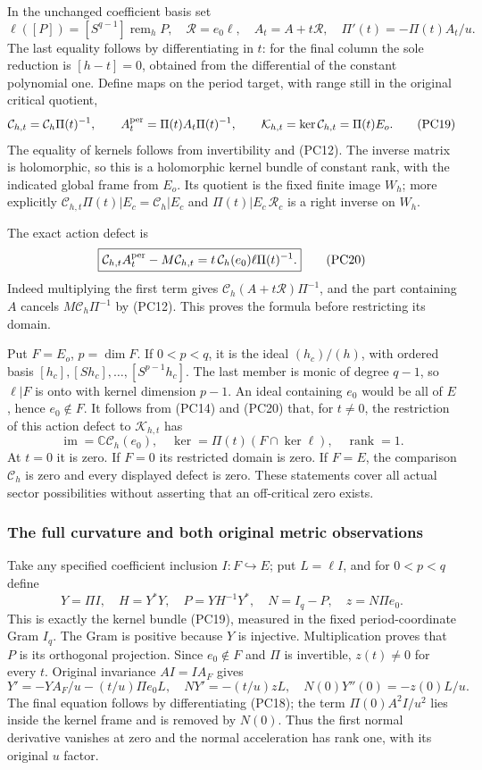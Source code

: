 In the unchanged coefficient basis set
\[
 \ell([P])=[S^{q-1}]\operatorname{rem}_hP,\quad
 \mathcal R=e_0\ell,\quad A_t=A+t\mathcal R,\quad
 \Pi'(t)=-\Pi(t)A_t/u.
 \tag{PC18}
\]
The last equality follows by differentiating in $t$: for the final
column the sole reduction is $[h-t]=0$, obtained from the
differential of the constant polynomial one.
Define maps on the period target, with range still in the original
critical quotient,
\[
 \mathcal C_{h,t}=\mathcal C_h\Pi(t)^{-1},\qquad
 A_t^{\rm per}=\Pi(t)A_t\Pi(t)^{-1},\qquad
 \mathcal K_{h,t}=\ker\mathcal C_{h,t}=\Pi(t)E_o.
 \tag{PC19}
\]
The equality of kernels follows from invertibility and (PC12).
The inverse matrix is holomorphic, so this is a holomorphic kernel
bundle of constant rank, with the indicated global frame from $E_o$.
Its quotient is the fixed finite image $W_h$; more explicitly
$\mathcal C_{h,t}\Pi(t)|E_c=\mathcal C_h|E_c$ and
$\Pi(t)|E_c\,\mathcal R_c$ is a right inverse on $W_h$.

The exact action defect is
\[
 \boxed{\mathcal C_{h,t}A_t^{\rm per}-M\mathcal C_{h,t}
       =t\,\mathcal C_h(e_0)\ell\Pi(t)^{-1}.}
 \tag{PC20}
\]
Indeed multiplying the first term gives
$\mathcal C_h(A+t\mathcal R)\Pi^{-1}$, and the part containing
$A$ cancels $M\mathcal C_h\Pi^{-1}$ by (PC12).  This proves
the formula before restricting its domain.

Put $F=E_o$, $p=\dim F$.  If $0<p<q$, it is the ideal
$(h_c)/(h)$, with ordered basis
$[h_c],[Sh_c],\ldots,[S^{p-1}h_c]$.
The last member is monic of degree $q-1$, so
$\ell|F$ is onto with kernel dimension $p-1$.
An ideal containing $e_0$ would be all of $E$, hence $e_0\notin F$.
It follows from (PC14) and (PC20) that, for $t\ne0$, the
restriction of this action defect to $\mathcal K_{h,t}$ has
\[
 \operatorname{im}=\mathbb C\mathcal C_h(e_0),\quad
 \ker=\Pi(t)(F\cap\ker\ell),\quad\operatorname{rank}=1.
 \tag{PC21}
\]
At $t=0$ it is zero.  If $F=0$ its restricted domain is zero.
If $F=E$, the comparison $\mathcal C_h$ is zero and every
displayed defect is zero.  These statements cover all actual
sector possibilities without asserting that an off-critical zero exists.

\subsubsection{The full curvature and both original metric observations}

Take any specified coefficient inclusion $I:F\hookrightarrow E$;
put $L=\ell I$, and for $0<p<q$ define
\[
 Y=\Pi I,\quad H=Y^*Y,\quad
 P=YH^{-1}Y^*,\quad N=I_q-P,\quad z=N\Pi e_0.
 \tag{PC22}
\]
This is exactly the kernel bundle (PC19), measured in the fixed
period-coordinate Gram $I_q$.  The Gram is positive because $Y$
is injective.  Multiplication proves that $P$ is its orthogonal
projection.  Since $e_0\notin F$ and $\Pi$ is invertible,
$z(t)\ne0$ for every $t$.  Original invariance $AI=IA_F$ gives
\[
 Y'=-YA_F/u-(t/u)\Pi e_0L,
 \quad NY'=-(t/u)zL,
 \quad N(0)Y''(0)=-z(0)L/u.
 \tag{PC23}
\]
The final equation follows by differentiating (PC18); the term
$\Pi(0)A^2I/u^2$ lies inside the kernel frame and is removed by
$N(0)$.  Thus the first normal derivative vanishes at zero and
the normal acceleration has rank one, with its original $u$ factor.


